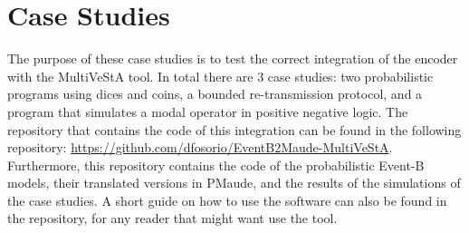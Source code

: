 \chapter{Case Studies}


The purpose of these case studies is to test the correct integration of the encoder with the MultiVeStA tool. In total there are 3 case studies: two probabilistic programs using dices and coins, a bounded re-transmission protocol, and a program that simulates a modal operator in positive negative logic. The repository that contains the code of this integration can be found in the following repository: \url{https://github.com/dfosorio/EventB2Maude-MultiVeStA}. Furthermore, this repository contains the code of the probabilistic Event-B models, their translated versions in PMaude, and the results of the simulations of the case studies. A short guide on how to use the software can also be found in the repository, for any reader that might want use the tool.



